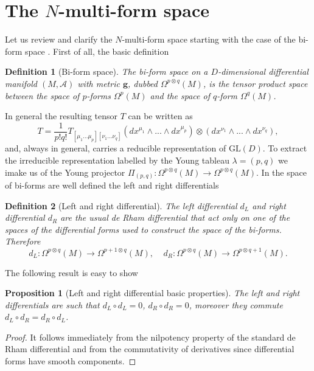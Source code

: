\documentclass[a4paper,12pt]{article}
\newtheorem{Definition}{Definition}[section]
\newtheorem{Proposition}{Proposition}[section]
\begin{document}
\section{The $N$-multi-form space}\label{nmulti}
Let us review and clarify the $N$-multi-form space starting with the case of the bi-form space \cite{Medeiros_2003,Francia:2004lbf}. First of all, the basic definition 
\begin{Definition}[Bi-form space]
    \textit{The bi-form space on a $D$-dimensional differential manifold $(M,\mathcal{A})$ with metric $\boldsymbol{g}$, dubbed $\Omega^{p \otimes q}(M)$, is the tensor product space between the space of $p$-forms $\Omega^{p}(M)$ and the space of $q$-form $\Omega^{q}(M)$.}
\end{Definition}
In general the resulting tensor $T$ can be written as
\begin{equation}
    T=\frac{1}{p!q!}T_{[\mu_1...\mu_p][\nu_1...\nu_q]}(dx^{\mu_1} \wedge ... \wedge dx^{\mu_p}) \otimes (dx^{\nu_1} \wedge ... \wedge dx^{\nu_q}),
\end{equation}
and, always in general, carries a reducible representation of $\mathrm{GL}(D)$. To extract the irreducible representation labelled by the Young tableau $\lambda=(p,q)$ we imake us of the Young projector $\Pi_{(p,q)} : \Omega^{p \otimes q}(M) \rightarrow \Omega^{p \otimes q}(M)$. In the space of bi-forms are well defined the left and right differentials 
\begin{Definition}[Left and right differential]
    \textit{The left differential $d_L$ and right differential $d_R$ are the usual de Rham differential that act only on one of the spaces of the differential forms used to construct the space of the bi-forms. Therefore}
    \begin{equation}
        d_L: \Omega^{p \otimes q}(M) \rightarrow \Omega^{p+1\otimes q}(M), \ \ \ \ \ d_R: \Omega^{p \otimes q}(M) \rightarrow \Omega^{p\otimes q+1}(M).
    \end{equation}
\end{Definition}
The following result is easy to show
\begin{Proposition}[Left and right differential basic properties]\label{lrd}
    The left and right differentials are such that $d_L \circ d_L=0$, $d_R \circ d_R=0$, moreover they commute $d_L\circ d_R=d_R\circ d_L$.
\end{Proposition}
\begin{proof}
    It follows immediately from the nilpotency property of the standard de Rham differential and from the commutativity of derivatives since differential forms have smooth components.
\end{proof}
\end{document}
